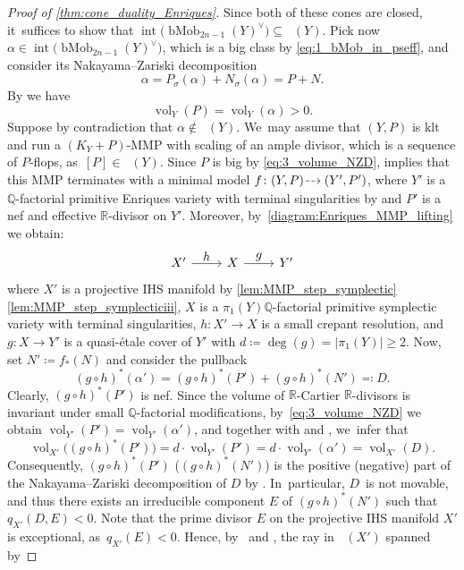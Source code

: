 \documentclass[JEP,XML,SOM,Unicode,published]{cedram}
\let\ts\textstyle
\newcommand{\dradpl}{{\hspace*{-2.5mm}\begin{tikzcd}[ampersand replacement=\&,column sep = scriptsize]\mbox{}\ar[r,dashed]\&\mbox{}\end{tikzcd}\hspace*{-2.5mm}}}
\newcommand{\dratst}{{\hspace*{-2.5mm}\begin{tikzcd}[ampersand replacement=\&,column sep = small]\mbox{}\ar[r,dashed]\&\mbox{}\end{tikzcd}\hspace*{-2mm}}}
\let\drascst\dratst
\newcommand{\dra}{\mathchoice{\dradpl}{\dratst}{\drascst}{\drascst}}
\theoremstyle{plain}
\theoremstyle{definition}
\newcommand{\Q}{\mathbb{Q}}
\newcommand{\R}{\mathbb{R}}
\DeclareMathOperator{\vol}{vol}
\DeclareMathOperator{\Movb}{\overline{\mathrm{Mov}}}
\DeclareMathOperator{\NEb}{\overline{\mathrm{NE}}}
\DeclareMathOperator{\bMob}{bMob}
\begin{document}
\begin{proof}[Proof of \autoref{thm:cone_duality_Enriques}]
Since both of these cones are closed, it~suffices to show that $\operatorname{int} \bigl(\bMob_{2n-1}(Y)^{\vee} \bigr) \subseteq \Movb(Y)$.
Pick now $\alpha \in \operatorname{int} \bigl(\bMob_{2n-1}(Y)^{\vee} \bigr)$, which is a big class by \eqref{eq:1_bMob_in_pseff}, and consider its Nakayama--Zariski decomposition
\[
\alpha = P_{\sigma}(\alpha) + N_{\sigma}(\alpha) = P + N.
\]
By \cite[Prop.\,3.20]{Boucksom04} we have
\begin{equation}
\label{eq:3_volume_NZD}
\vol_Y (P) = \vol_Y (\alpha) > 0.
\end{equation}
Suppose by contradiction that $\alpha \notin \Movb(Y)$. We~may assume that $(Y,P)$ is klt and run a $(K_Y+P)$-MMP with scaling of an ample divisor, which is a sequence of $P$\nobreakdash-flops, as~$[P] \in \Movb(Y)$. Since $P$ is big by \eqref{eq:3_volume_NZD}, \cite[Cor.\,1.4.2]{BCHM10} implies that this MMP terminates with a minimal model $f \colon (Y,P) \dra (Y',P')$, where $Y'$ is a $\Q$\nobreakdash-factorial primitive Enriques variety with terminal singularities by \cite[Lem.\,3.38]{KM98} and $P'$ is a nef and effective $\R$\nobreakdash-divisor on $Y'$.
Moreover, by~\eqref{diagram:Enriques_MMP_lifting} we obtain:
\[
\begin{tikzcd}
X' \arrow[r,"\ts h"] & X \arrow[r,"\ts g"] & Y'
\end{tikzcd}
\]
where $X'$ is a projective IHS manifold by \autoref{lem:MMP_step_symplectic}\eqref{lem:MMP_step_symplecticiii}, $X$ is a $\pi_1(Y)\Q$-factorial primitive symplectic variety with terminal singularities, $h \colon X' \to X$ is a small crepant resolution, and $g \colon X \to Y'$ is a quasi-étale cover of $Y'$ with $d \coloneqq \deg(g) = |\pi_1(Y)| \geq 2$.
Now, set $N' \coloneqq f_*(N)$ and consider the pullback
\[
(g\circ h)^*(\alpha') = (g\circ h)^*(P') + (g\circ h)^*(N') \eqqcolon D.
\]
Clearly, $(g\circ h)^*(P')$ is nef.
Since the volume of $\R$-Cartier $\R$\nobreakdash-divisors is invariant under small $\Q$\nobreakdash-factorial modifications, by~\eqref{eq:3_volume_NZD} we obtain $\vol_{Y'}(P') = \vol_{Y'}(\alpha')$, and together with \cite[Prop.\,2.2.43]{Laz04book_I} and \cite[Prop.\,2.9(1)]{Kuronya06}, we~infer that
\[
\vol_{X'} \bigl((g\circ h)^*(P') \bigr) = d \cdot \vol_{Y'}(P') = d \cdot \vol_{Y'}(\alpha') = \vol_{X'}(D).
\]
Consequently, $(g\circ h)^*(P')$ (\resp $(g\circ h)^*(N')$) is the positive (\resp negative) part of the Nakayama--Zariski decomposition of $D$ by \cite[Rem.\,2.3]{DNFT17}. In~particular, $D$~is not movable, and thus there exists an irreducible component $E$ of $(g\circ h)^*(N')$ such that $q_{X'}(D,E)<0$. Note that the prime divisor $E$ on the projective IHS manifold $X'$ is exceptional, as~$q_{X'}(E) < 0$. Hence, by~\cite[Prop.\,3.1 \& Cor.\,3.6(1)]{Markman13} and \cite[Th.\,1]{Kaw91}, the ray in $\NEb(X')$ spanned by

\end{proof}
\end{document}
